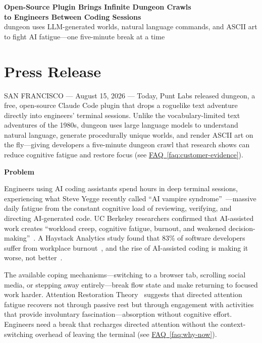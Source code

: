 \documentclass[11pt,letterpaper]{article}
\newcommand{\prsection}[1]{%
  \vspace{1em}%
  {\large\bfseries\color{SectionBlue}#1}%
  \vspace{0.3em}\par%
}
\newcommand{\faqref}[1]{\hyperref[#1]{FAQ~\ref*{#1}}}
\begin{document}
\begin{center}
  {\LARGE\bfseries\color{SectionBlue} Open-Source Plugin Brings Infinite Dungeon Crawls\\to Engineers Between Coding Sessions} \\[0.8em]
  {\large\color{AccentGray} dungeon uses LLM-generated worlds, natural language commands, and ASCII art to fight AI fatigue---one five-minute break at a time}
\end{center}

\vspace{0.5em}


\section*{Press Release}

SAN FRANCISCO --- August 15, 2026 --- Today, Punt Labs released dungeon, a free, open-source Claude Code plugin that drops a roguelike text adventure directly into engineers' terminal sessions. Unlike the vocabulary-limited text adventures of the 1980s, dungeon uses large language models to understand natural language, generate procedurally unique worlds, and render ASCII art on the fly---giving developers a five-minute dungeon crawl that research shows can reduce cognitive fatigue and restore focus (see \faqref{faq:customer-evidence}).

\prsection{Problem}

Engineers using AI coding assistants spend hours in deep terminal sessions, experiencing what Steve Yegge recently called ``AI vampire syndrome''~\cite{yegge2026aivampire}---massive daily fatigue from the constant cognitive load of reviewing, verifying, and directing AI-generated code. UC Berkeley researchers confirmed that AI-assisted work creates ``workload creep, cognitive fatigue, burnout, and weakened decision-making''~\cite{fortune2026ucberkeley}. A Haystack Analytics study found that 83\% of software developers suffer from workplace burnout~\cite{haystack2021burnout}, and the rise of AI-assisted coding is making it worse, not better~\cite{hbr2026aiintensifies}.

The available coping mechanisms---switching to a browser tab, scrolling social media, or stepping away entirely---break flow state and make returning to focused work harder. Attention Restoration Theory~\cite{kaplan1995art} suggests that directed attention fatigue recovers not through passive rest but through engagement with activities that provide involuntary fascination---absorption without cognitive effort. Engineers need a break that recharges directed attention without the context-switching overhead of leaving the terminal (see \faqref{faq:why-now}).
\end{document}
